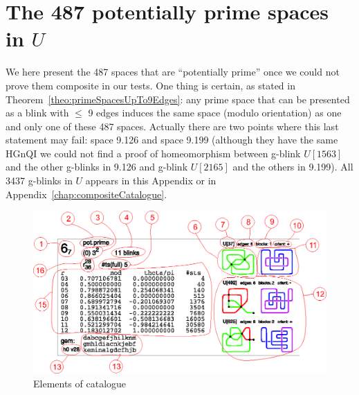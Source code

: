 \chapter{The 487 potentially prime spaces in $U$}
\label{chap:primeCatalogue}

We here present the 487 spaces that are ``potentially prime'' once we could
not prove them composite in our tests. One thing is certain, as stated in
Theorem~\ref{theo:primeSpacesUpTo9Edges}: any prime space that can be
presented as a blink with $\leq$ 9 edges induces the same space (modulo
orientation) as one and only one of these 487 spaces. Actually there
are two points where this last statement may fail: space 9.126 and space 9.199 (although
they have the same HGnQI we could not find a proof of homeomorphism
between g-blink $U[1563]$ and the other g-blinks in 9.126 and g-blink $U[2165]$
and the others in 9.199). All 3437 g-blinks in $U$ appears in this Appendix or
in Appendix~\ref{chap:compositeCatalogue}.

\begin{figure}[htp]
   \begin{center}
      \leavevmode
      \includegraphics[width=14.5cm]{fig/catalogueexplanation.eps}
   \end{center}
   \vspace{-0.7cm}
   \caption{ Elements of catalogue}
   \label{fig:catalogueExplanation}
\end{figure}

